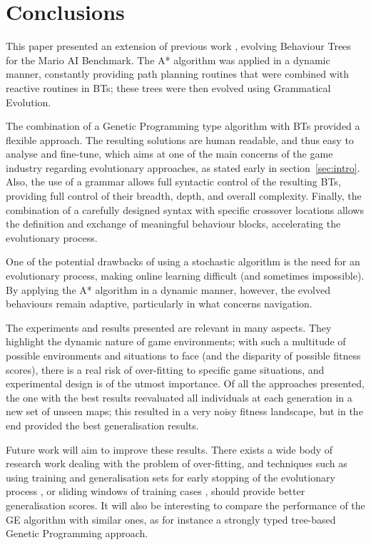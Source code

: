 \documentclass[conference]{IEEEtran}
\begin{document}
\section{Conclusions}

This paper presented an extension of previous work \cite{PNO11}, evolving
Behaviour Trees for the Mario AI Benchmark. The A* algorithm was applied in a
dynamic manner, constantly providing path planning routines that were combined
with reactive routines in BTs; these trees were then evolved using Grammatical
Evolution.

The combination of a Genetic Programming type algorithm with BTs provided a
flexible approach. The resulting solutions are human readable, and
thus easy to analyse and fine-tune, which aims at one of the main concerns
of the game industry regarding evolutionary approaches, as stated early in 
section~\ref{sec:intro}. Also, the use of a grammar allows full
syntactic control of the resulting BTs, providing full control of their
breadth, depth, and overall complexity. Finally, the
combination of a carefully designed syntax with specific crossover locations
allows the definition and exchange of meaningful behaviour blocks, accelerating
the evolutionary process.

One of the potential drawbacks of using a stochastic algorithm is the need for
an evolutionary process, making online learning difficult (and sometimes
impossible). By applying the A* algorithm in a dynamic manner, however, the
evolved behaviours remain adaptive, particularly in what concerns navigation.

The experiments and results presented are relevant in many aspects. They
highlight the dynamic nature of game environments; with such a multitude of
possible environments and situations to face (and the disparity of possible
fitness scores), there is a real risk of over-fitting to specific game
situations, and experimental design is of the utmost importance. Of all the
approaches presented, the one with the best results reevaluated all individuals
at each generation in a new set of unseen maps; this resulted in a very noisy
fitness landscape, but in the end provided the best generalisation results.

Future work will aim to improve these results. There exists a wide body of research work
dealing with the problem of over-fitting, and techniques such as using training
and generalisation sets for early stopping of the evolutionary process
\cite{Pre97}, or sliding windows of training cases \cite{WAW07}, should provide
better generalisation scores. It will also be interesting to compare the performance of
the GE algorithm with similar ones, as for instance a strongly typed tree-based 
Genetic Programming approach.
\end{document}
